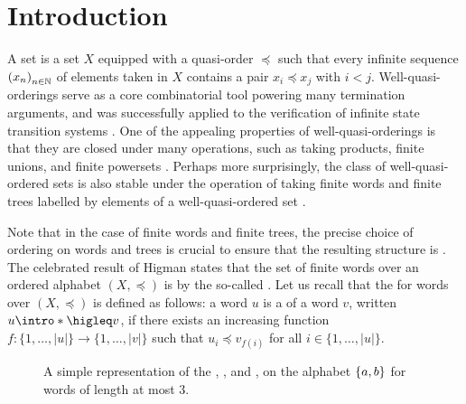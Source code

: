 \section{Introduction}
\label{introduction:sec}

A  set is a set $X$ equipped with a quasi-order
$\preceq$ such that every infinite sequence $\seqof{x_n}$ of elements taken in
$X$ contains a pair $x_i \preceq x_j$ with $i < j$. Well-quasi-orderings serve
as a core combinatorial tool powering many termination arguments, and was
successfully applied to the verification of infinite state transition systems
\cite{ABDU96,ABDU98}. One of the appealing properties of well-quasi-orderings
is that they are closed under many operations, such as taking products, finite
unions, and finite powersets \cite{SCSC12}. Perhaps more surprisingly, the
class of well-quasi-ordered sets is also stable under the operation of taking
finite words and finite trees labelled by elements of a well-quasi-ordered set
\cite{HIG52,KRU72}.

\AP
Note that in the case of finite words and finite trees, the precise choice of
ordering on words and trees is crucial to ensure that the resulting structure
is . The celebrated result of Higman states that the set
of finite words over an ordered alphabet $(X, \preceq)$ is
 by the so-called 
\cite{HIG52}. Let us recall that the  for words over $(X,
\preceq)$ is defined as follows: a word $u$ is a  of a word $v$,
written $u \intro*\higleq v$,
if there exists an increasing function $f \colon \{1, \ldots, |u|\} \to \{1,
\ldots, |v|\}$ such that $u_i \preceq v_{f(i)}$ for all $i \in \{1, \ldots,
|u|\}$.

\begin{figure}
    \centering
    

    

    
    \caption{A simple representation of the ,
        ,
        and ,
        on the alphabet $\{ a,b \}$ for words of
        length at most $3$.}
    \label{word-embeddings:fig}
\end{figure}

